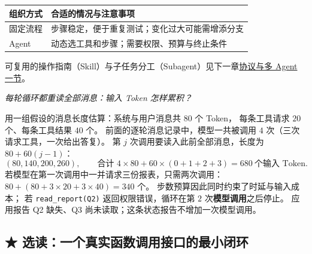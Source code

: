 \begin{center}
\small
\renewcommand{\arraystretch}{1.3}
\begin{tabularx}{\linewidth}{@{}p{26mm}X@{}}
\toprule
组织方式 & 合适的情况与注意事项\\
\midrule
固定流程 & 步骤稳定，便于重复测试；变化过大可能需增添分支\\
Agent & 动态选工具和步骤；需要权限、预算与终止条件\\
\bottomrule
\end{tabularx}
\end{center}
可复用的操作指南（Skill）与子任务分工（Subagent）见下一章\hyperref[concept:skill]{协议与多 Agent 一节}。


\begin{example}[breakable=false]
\noindent\emph{每轮循环都重读全部消息：输入 Token 怎样累积？}\par
用一组假设的消息长度估算：系统与用户消息共 $80$ 个 Token，
每条工具请求 $20$ 个、每条工具结果 $40$ 个。
前面的逐轮消息记录中，模型一共被调用 $4$ 次（三次请求工具，一次给出答复）。
第 $j$ 次调用要读入此前全部消息，长度为 $80+60(j-1)$：
\[
(80,140,200,260),\qquad
\text{合计 } 4\times80+60\times(0+1+2+3)=\boxed{680}\ \text{个输入 Token}.
\]
若模型在第一次调用中一并请求三份报表，只需两次调用：$80+(80+3\times20+3\times40)=340$ 个。
步数预算因此同时约束了时延与输入成本；
若 \texttt{read\_report(Q2)} 返回权限错误，循环在第 $2$ 次\textbf{模型调用}之后停止。
应用报告 Q2 缺失、Q3 尚未读取；这条状态报告不增加一次模型调用。
\end{example}
\subsection{\texorpdfstring{{\symboliconfont ★}}{★} 选读：一个真实函数调用接口的最小闭环}
\label{elective:real-function-call}

